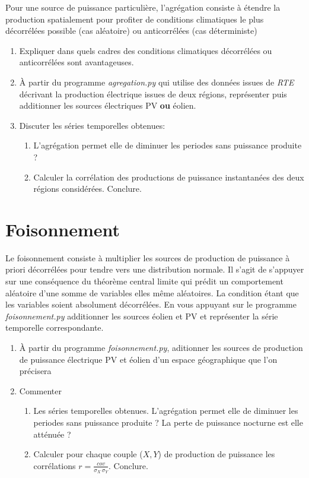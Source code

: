 \documentclass[12pt,a4,french]{article}
\newcommand{\tmtextit}[1]{{\itshape{#1}}}
\begin{document}
Pour une source de puissance particulière, l'agrégation consiste à étendre la production spatialement pour profiter de conditions climatiques le plus décorrélées possible (cas aléatoire) ou anticorrélées (cas déterministe)
\begin{enumerate}
	\item Expliquer dans quels cadres des conditions climatiques décorrélées ou anticorrélées sont avantageuses.
  	\item À partir du programme \tmtextit{agregation.py} qui utilise des
  données issues de \tmtextit{RTE} décrivant la production électrique
  issues de deux régions, représenter puis additionner les sources
  électriques PV \textbf{ou} éolien.
	\item Discuter les séries temporelles obtenues:
  \begin{enumerate}
    \item L'agrégation permet elle de
    diminuer les periodes sans puissance produite ?
    \item Calculer la corrélation des productions de puissance instantanées des deux régions considérées. Conclure.
  \end{enumerate}
\end{enumerate}

\section{Foisonnement}

Le foisonnement consiste à multiplier les sources de production de puissance
à priori décorrélées pour tendre vers une distribution normale. Il s'agit de s'appuyer sur une conséquence du théorème central limite qui prédit un
comportement aléatoire d'une somme de variables elles même aléatoires. La
condition étant que les variables soient absolument décorrélées. En vous
appuyant sur le programme \tmtextit{foisonnement.py} additionner les sources
éolien et PV et représenter la série temporelle correspondante.

\begin{enumerate}
  \item À partir du programme \tmtextit{foisonnement.py}, aditionner les
  sources de production de puissance électrique PV et éolien d'un espace géographique que l'on précisera 
  
  \item Commenter
  \begin{enumerate}
    \item Les séries temporelles obtenues. L'agrégation permet elle de
    diminuer les periodes sans puissance produite ? La perte de puissance
    nocturne est elle atténuée ?
        
    \item Calculer pour chaque couple ($X,Y$) de production de puissance les corrélations $r=\frac{cov}{\sigma_X \, \sigma_Y}$. Conclure.
    
  \end{enumerate}
\end{enumerate}
\end{document}
